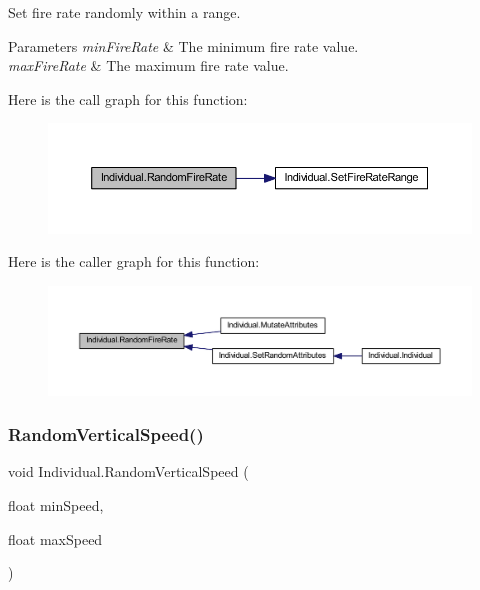 Set fire rate randomly within a range. 


\begin{DoxyParams}{Parameters}
{\em min\+Fire\+Rate} & The minimum fire rate value.\\
\hline
{\em max\+Fire\+Rate} & The maximum fire rate value.\\
\hline
\end{DoxyParams}
Here is the call graph for this function\+:\nopagebreak
\begin{figure}[H]
\begin{center}
\leavevmode
\includegraphics[width=350pt]{class_individual_ad6ad54b9dd02fcb02b5a11738585d41c_cgraph}
\end{center}
\end{figure}
Here is the caller graph for this function\+:\nopagebreak
\begin{figure}[H]
\begin{center}
\leavevmode
\includegraphics[width=350pt]{class_individual_ad6ad54b9dd02fcb02b5a11738585d41c_icgraph}
\end{center}
\end{figure}
\mbox{\label{class_individual_ab66822b58148ba1507d2e27aff8676e7}} 
\subsubsection{\texorpdfstring{Random\+Vertical\+Speed()}{RandomVerticalSpeed()}}
{\footnotesize\ttfamily void Individual.\+Random\+Vertical\+Speed (\begin{DoxyParamCaption}\item[{float}]{min\+Speed,  }\item[{float}]{max\+Speed }\end{DoxyParamCaption})}



